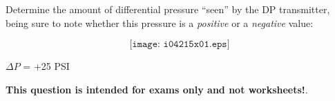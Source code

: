 

Determine the amount of differential pressure ``seen'' by the DP transmitter, being sure to note whether this pressure is a {\it positive} or a {\it negative} value:

$$\texttt{[image: i04215x01.eps]}$$







$\Delta P$ = +25 PSI







{\bf This question is intended for exams only and not worksheets!}.



